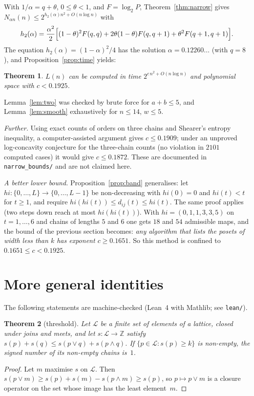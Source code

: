 \documentclass[11pt]{article}
\newtheorem{theorem}{Theorem}
\theoremstyle{definition}
\theoremstyle{remark}
\begin{document}
With $1/\alpha=q+\theta$, $0\le\theta<1$, and $F=\log_2P$, Theorem~\ref{thm:narrow} gives
$N_{\alpha n}(n)\le2^{h_2(\alpha)n^2+O(n\log n)}$ with
\[
h_2(\alpha)=\frac{\alpha^2}{2}\Bigl[(1-\theta)^2F(q,q)+2\theta(1-\theta)F(q,q+1)
+\theta^2F(q+1,q+1)\Bigr].
\]
The equation $h_2(\alpha)=(1-\alpha)^2/4$ has the solution $\alpha=0.12260\ldots$
(with $q=8$), and Proposition~\ref{prop:time} yields:

\begin{theorem}\label{thm:main2}
$L(n)$ can be computed in time $2^{c\,n^2+O(n\log n)}$ and polynomial space with
$c<0.1925$.
\end{theorem}

Lemma~\ref{lem:two} was checked by brute force for $a+b\le5$, and
Lemma~\ref{lem:smooth} exhaustively for $n\le14$, $w\le5$.

\medskip\noindent\emph{Further.} Using exact counts of orders on three chains and
Shearer's entropy inequality, a computer-assisted argument gives $c\le0.1909$; under an
unproved log-concavity conjecture for the three-chain counts (no violation in $2101$
computed cases) it would give $c\le0.1872$. These are documented in
\texttt{narrow\_bounds/} and are not claimed here.

\medskip\noindent\emph{A better lower bound.} Proposition~\ref{prop:band} generalises: let
$\mathit{hi}\colon\{0,\dots,L\}\to\{0,\dots,L-1\}$ be non-decreasing with
$\mathit{hi}(0)=0$ and $\mathit{hi}(t)<t$ for $t\ge1$, and require
$\mathit{hi}(\mathit{hi}(t))\le d_{ij}(t)\le\mathit{hi}(t)$. The same proof applies (two
steps down reach at most $\mathit{hi}(\mathit{hi}(t))$). With
$\mathit{hi}=(0,1,1,3,3,5)$ on $t=1,\dots,6$ and chains of lengths $5$ and $6$ one gets
$18$ and $54$ admissible maps, and the bound of the previous section becomes:
\emph{any algorithm that lists the posets of width less than $k$ has exponent
$c\ge0.1651$.} So this method is confined to $0.1651\le c<0.1925$.

\section{More general identities}

The following statements are machine-checked (Lean~4 with Mathlib; see \texttt{lean/}).

\begin{theorem}[threshold]\label{thm:threshold}
Let $\mathcal L$ be a finite set of elements of a lattice, closed under joins and meets, and
let $s\colon\mathcal L\to\mathbb{Z}$ satisfy $s(p)+s(q)\le s(p\vee q)+s(p\wedge q)$. If
$\{p\in\mathcal L:s(p)\ge k\}$ is non-empty, the signed number of its non-empty chains is~$1$.
\end{theorem}
\begin{proof}
Let $m$ maximise $s$ on $\mathcal L$. Then $s(p\vee m)\ge s(p)+s(m)-s(p\wedge m)\ge s(p)$, so
$p\mapsto p\vee m$ is a closure operator on the set whose image has the least element~$m$.
\end{proof}
\end{document}
